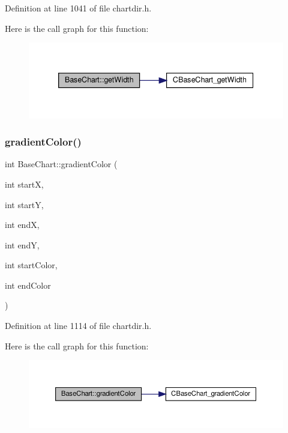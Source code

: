 Definition at line 1041 of file chartdir.\+h.

Here is the call graph for this function\+:
\nopagebreak
\begin{figure}[H]
\begin{center}
\leavevmode
\includegraphics[width=339pt]{class_base_chart_a03cb746f83c8b4cc8e49e55986c5e44a_cgraph}
\end{center}
\end{figure}
\mbox{\label{class_base_chart_a08b315e98f520c49fbe393738a978f00}} 
\subsubsection{\texorpdfstring{gradient\+Color()}{gradientColor()}\hspace{0.1cm}{\footnotesize\ttfamily [1/3]}}
{\footnotesize\ttfamily int Base\+Chart\+::gradient\+Color (\begin{DoxyParamCaption}\item[{int}]{startX,  }\item[{int}]{startY,  }\item[{int}]{endX,  }\item[{int}]{endY,  }\item[{int}]{start\+Color,  }\item[{int}]{end\+Color }\end{DoxyParamCaption})\hspace{0.3cm}{\ttfamily [inline]}}



Definition at line 1114 of file chartdir.\+h.

Here is the call graph for this function\+:
\nopagebreak
\begin{figure}[H]
\begin{center}
\leavevmode
\includegraphics[width=350pt]{class_base_chart_a08b315e98f520c49fbe393738a978f00_cgraph}
\end{center}
\end{figure}
\mbox{\label{class_base_chart_a645f49a14197731a2e96e02c8df1f468}} 
